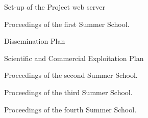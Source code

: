 \begin{workpackage}
\begin{wpdelivs}
  \begin{wpdeliv}[due=2,id=website,nature=O,dissem=PU,miles=kickoff]
     {Set-up of the Project web server}
   \end{wpdeliv}
   \begin{wpdeliv}[due=8,id=ws1proc,nature=R,dissem=PU,miles={kickoff}]
     {Proceedings of the first {\pn} Summer School.}
   \end{wpdeliv}
   \begin{wpdeliv}[due=9,id=dissem,nature=R,dissem=PP]
     {Dissemination Plan}
   \end{wpdeliv}
   \begin{wpdeliv}[due=9,id=exploitplan,nature=R,dissem=PP,miles=exploitation]
     {Scientific and Commercial Exploitation Plan}
   \end{wpdeliv}
   \begin{wpdeliv}[due=20,id=ws2proc,nature=R,dissem=PU,miles={exploitation}]
     {Proceedings of the second {\pn} Summer School.}
   \end{wpdeliv}
   \begin{wpdeliv}[due=32,id=ss1proc,nature=R,dissem=PU,miles={exploitation}]
     {Proceedings of the third {\pn} Summer School.}
   \end{wpdeliv}
   \begin{wpdeliv}[due=44,id=ws3proc,nature=R,dissem=PU,miles=exploitation]
     {Proceedings of the fourth {\pn} Summer School.}
   \end{wpdeliv}
 \end{wpdelivs}
\end{workpackage}


